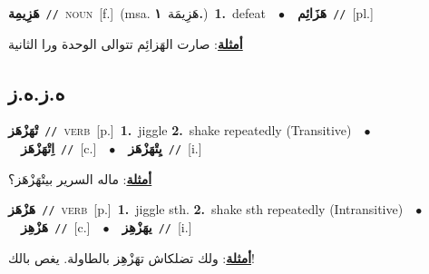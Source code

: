 \documentclass[10pt,a4paper,twoside]{article} %
\begin{document}
\begin{multicols}{2}
{\setlength\topsep{0pt}\textbf{\foreignlanguage{arabic}{هَزِيمِة}}\ {\color{gray}\texttt{//}\color{black}}\ \textsc{noun}\ [f.]\ \color{gray}(msa. \foreignlanguage{arabic}{هَزِيمَة}~\foreignlanguage{arabic}{\textbf{١.}})\color{black}\ \textbf{1.}~defeat\ \ $\bullet$\ \ \setlength\topsep{0pt}\textbf{\foreignlanguage{arabic}{هَزَائِم}}\ {\color{gray}\texttt{//}\color{black}}\ [pl.]\  \begin{flushright}\color{gray}\foreignlanguage{arabic}{\textbf{\underline{\foreignlanguage{arabic}{أمثلة}}}: صارت الهَزائِم تتوالى الوحدة ورا الثانية}\end{flushright}\color{black}} \vspace{2mm}

\vspace{-3mm}
\subsection*{\color{blue}\foreignlanguage{arabic}{ه.ز.ه.ز}\color{blue}{}} 

{\setlength\topsep{0pt}\textbf{\foreignlanguage{arabic}{تْهَزْهَز}}\ {\color{gray}\texttt{//}\color{black}}\ \textsc{verb}\ [p.]\ \textbf{1.}~jiggle  \textbf{2.}~shake repeatedly (Transitive)\ \ $\bullet$\ \ \setlength\topsep{0pt}\textbf{\foreignlanguage{arabic}{اِتْهَزْهَز}}\ {\color{gray}\texttt{//}\color{black}}\ [c.]\ \ $\bullet$\ \ \setlength\topsep{0pt}\textbf{\foreignlanguage{arabic}{يِتْهَزْهَز}}\ {\color{gray}\texttt{//}\color{black}}\ [i.]\  \begin{flushright}\color{gray}\foreignlanguage{arabic}{\textbf{\underline{\foreignlanguage{arabic}{أمثلة}}}: ماله السرير بيتْهَزْهَز؟}\end{flushright}\color{black}} \vspace{2mm}

{\setlength\topsep{0pt}\textbf{\foreignlanguage{arabic}{هَزْهَز}}\ {\color{gray}\texttt{//}\color{black}}\ \textsc{verb}\ [p.]\ \textbf{1.}~jiggle sth.  \textbf{2.}~shake sth repeatedly (Intransitive)\ \ $\bullet$\ \ \setlength\topsep{0pt}\textbf{\foreignlanguage{arabic}{هَزْهِز}}\ {\color{gray}\texttt{//}\color{black}}\ [c.]\ \ $\bullet$\ \ \setlength\topsep{0pt}\textbf{\foreignlanguage{arabic}{يهَزْهِز}}\ {\color{gray}\texttt{//}\color{black}}\ [i.]\  \begin{flushright}\color{gray}\foreignlanguage{arabic}{\textbf{\underline{\foreignlanguage{arabic}{أمثلة}}}: ولك تضلكاش تهَزْهِز بالطاولة. يغص بالك!}\end{flushright}\color{black}} \vspace{2mm}


\end{multicols}
\end{document}
